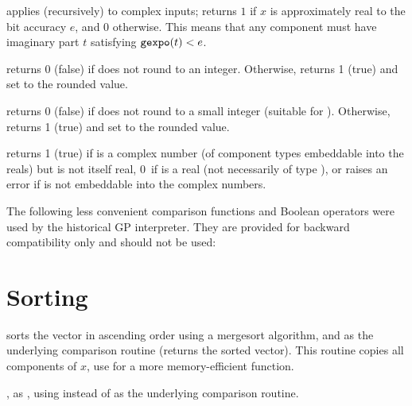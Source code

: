  applies (recursively) to complex inputs;
returns $1$ if $x$ is approximately real to the bit accuracy $e$, and 0
otherwise. This means that any  component must have imaginary part
$t$ satisfying ${\tt gexpo}(t) < e$.

 returns 0 (false) if  does not round
to an integer. Otherwise, returns 1 (true) and set  to the rounded
value.

 returns 0 (false) if  does not
round to a small integer (suitable for ). Otherwise, returns 1
(true) and set  to the rounded value.

 returns 1 (true) if  is a complex number
(of component types embeddable into the reals) but is not itself real, 0~if
 is a real (not necessarily of type ), or raises an error if
 is not embeddable into the complex numbers.


The following less convenient comparison functions and Boolean operators were
used by the historical GP interpreter. They are provided for backward
compatibility only and should not be used:










\section{Sorting}


 sorts the vector  in ascending order using a
mergesort algorithm, and  as the underlying comparison routine
(returns the sorted vector). This routine copies all components of $x$, use
 for a more memory-efficient function.

, as , using  instead of
 as the underlying comparison routine.

